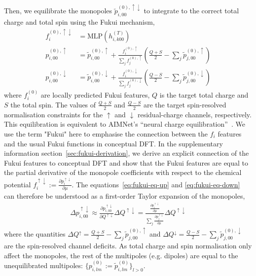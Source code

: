 \documentclass[aps,%
superscriptaddress,
 amsmath,amssymb,
floatfix,
twocolumn
]{revtex4-2}
\begin{document}
Then, we equilibrate the monopoles $\tilde{p}_{i, 00}^{(0), \uparrow \downarrow}$ to integrate to the correct total charge and total spin using the Fukui mechanism,
%
\begin{align}
f_i^{(0), \uparrow \downarrow} &= \text{MLP}(h_{i,k00}^{(T)}) \\
p_{i, 00}^{(0), \uparrow} &= \tilde{p}_{i, 00}^{(0),\uparrow} + \frac{f_i^{(0),\uparrow}}{\sum_j f_j^{(0), \uparrow}} \left( \frac{Q + S}{2} - \sum_j \tilde{p}_{j, 00}^{(0),\uparrow} \right) \label{eq:fukui-eq-up}\\
p_{i, 00}^{(0), \downarrow} &= \tilde{p}_{i, 00}^{(0), \downarrow} + \frac{f_i^{(0),\downarrow}}{\sum_j f_j^{(0), \downarrow}} \left( \frac{Q - S}{2} - \sum_j \tilde{p}_{j, 00}^{(0), \downarrow} \right)
\label{eq:fukui-eq-down}
\end{align}
%
where $f_i^{(0)}$ are locally predicted Fukui features, $Q$ is the target total charge and $S$ the total spin. The values of $\frac{Q + S}{2}$ and $\frac{Q - S}{2}$ are the target spin-resolved normalisation constraints for the $\uparrow$ and $\downarrow$ residual-charge channels, respectively. This equilibration is equivalent to AIMNet's ``neural charge equilibration''~\cite{aimnetnse}. We use the term "Fukui" here to emphasise the connection between the $f_i$ features and the usual Fukui functions in conceptual DFT. In the supplementary information section~\ref{sec:fukui-derivation}, we derive an explicit connection of the Fukui features to conceptual DFT and show that the Fukui features are equal to the partial derivative of the monopole coefficients with respect to the chemical potential $f_{i}^{\uparrow \downarrow} := \frac{\partial p_{i}^{\uparrow \downarrow}}{\partial \mu}$. The equations~\ref{eq:fukui-eq-up} and \ref{eq:fukui-eq-down} can therefore be understood as a first-order Taylor expansion of the monopoles,
%
\begin{align}
    \Delta p_{i,00}^{\uparrow \downarrow} \approx \frac{\partial  p_{i,00}^{\uparrow \downarrow}}{\partial Q^{\uparrow \downarrow}} \Delta Q^{\uparrow \downarrow} = \frac{\frac{\partial p_{i}^{\uparrow \downarrow}}{\partial \mu}}{\sum_j \frac{\partial p_{j}^{\uparrow \downarrow}}{\partial \mu}} \Delta Q^{\uparrow \downarrow}
\end{align}
%
where the quantities $\Delta Q^{\uparrow} = \frac{Q + S}{2} - \sum_j \tilde{p}_{j, 00}^{(0),\uparrow}$ and $\Delta Q^{\downarrow} = \frac{Q - S}{2}- \sum_j \tilde{p}_{j, 00}^{(0),\downarrow}$ are the spin-resolved channel deficits. As total charge and spin normalisation only affect the monopoles, the rest of the multipoles (e.g. dipoles) are equal to the unequilibrated multipoles: $\{p_{i,lm}^{(0)}:=\tilde{p}^{(0)}_{i,lm}\}_{l>0}$.
\end{document}
